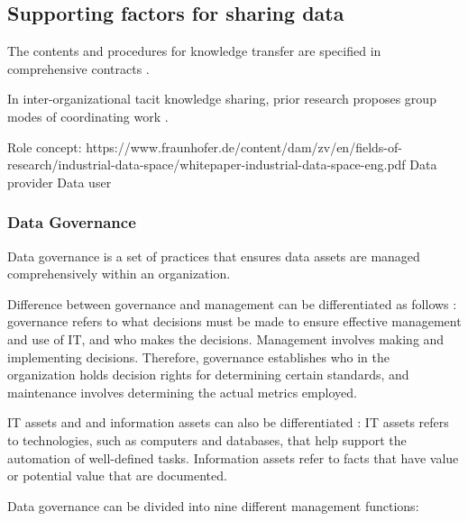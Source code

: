 \subsection{Supporting factors for sharing data}

The contents and procedures for knowledge transfer are specified in comprehensive contracts \cite{walsh1987formalization}.  


In inter-organizational tacit knowledge sharing, prior research proposes group modes of coordinating work \cite{van1976determinants}. 


Role concept: https://www.fraunhofer.de/content/dam/zv/en/fields-of-research/industrial-data-space/whitepaper-industrial-data-space-eng.pdf
Data provider
Data user

\subsubsection{Data Governance}
Data governance is a set of practices that ensures data assets are managed comprehensively within an organization. 

Difference between governance and management can be differentiated as follows \cite{khatri2010designing}: governance refers to what decisions must be made to ensure effective management and use of IT, and who makes the decisions. Management involves making and implementing decisions. Therefore, governance establishes who in the organization holds decision rights for determining certain standards, and maintenance involves determining the actual metrics employed.

IT assets and and information assets can also be differentiated \cite{khatri2010designing}: IT assets refers to technologies, such as computers and databases, that help support the automation of well-defined tasks. Information assets refer to facts that have value or potential value that are documented. 


Data governance can be divided into nine different management functions\cite{mosley2010dama}: 


